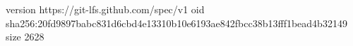 version https://git-lfs.github.com/spec/v1
oid sha256:20fd9897babc831d6cbd4e13310b10e6193ae842fbcc38b13fff1bead4b32149
size 2628
